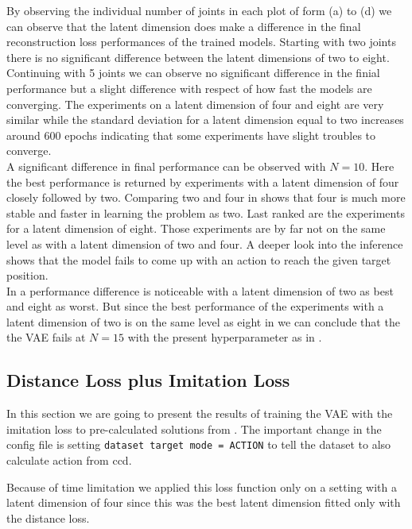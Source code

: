 By observing the individual number of joints in each plot of  form (a) to (d) we can observe that the latent dimension does make a difference in the final reconstruction loss performances of the trained models. Starting with two joints there is no significant difference between the latent dimensions of two to eight. Continuing with 5 joints we can observe no significant difference in the finial performance but a slight difference with respect of how fast the models are converging. The experiments on a latent dimension of four and eight are very similar while the standard deviation for a latent dimension equal to two increases around 600 epochs indicating that some experiments have slight troubles to converge. \\
A significant difference in final performance can be observed with $N = 10$. Here the best performance is returned by experiments with a latent dimension of four closely followed by two. Comparing two and four in  shows that four is much more stable and faster in learning the problem as two. Last ranked are the experiments for a latent dimension of eight. Those experiments are by far not on the same level as with a latent dimension of two and four. A deeper look into the inference shows that the model fails to come up with an action to reach the given target position.\\
In  a performance difference is noticeable with a latent dimension of two as best and eight as worst. But since the best performance of the experiments with a latent dimension of two is on the same level as eight in  we can conclude that the the VAE fails at $N = 15$ with the present hyperparameter as in .

\subsection{Distance Loss plus Imitation Loss}

In this section we are going to present the results of training the VAE with the imitation loss to pre-calculated solutions from . The important change in the config file is setting \texttt{dataset target mode = ACTION} to tell the dataset to also calculate action from ccd.  

Because of time limitation we applied this loss function only on a setting with a latent dimension of four since this was the best latent dimension fitted only with the distance loss. 

